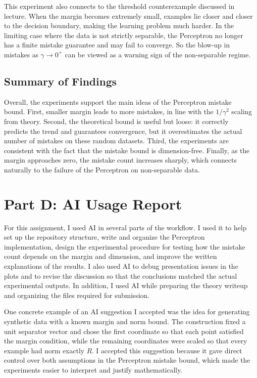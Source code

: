 \documentclass{article}
\begin{document}
This experiment also connects to the threshold counterexample discussed in lecture. When the margin becomes extremely small, examples lie closer and closer to the decision boundary, making the learning problem much harder. In the limiting case where the data is not strictly separable, the Perceptron no longer has a finite mistake guarantee and may fail to converge. So the blow-up in mistakes as \(\gamma \to 0^+\) can be viewed as a warning sign of the non-separable regime.

\subsection{Summary of Findings}

Overall, the experiments support the main ideas of the Perceptron mistake bound. First, smaller margin leads to more mistakes, in line with the \(1/\gamma^2\) scaling from theory. Second, the theoretical bound is useful but loose: it correctly predicts the trend and guarantees convergence, but it overestimates the actual number of mistakes on these random datasets. Third, the experiments are consistent with the fact that the mistake bound is dimension-free. Finally, as the margin approaches zero, the mistake count increases sharply, which connects naturally to the failure of the Perceptron on non-separable data.
\section{Part D: AI Usage Report}
For this assignment, I used AI in several parts of the workflow. I used it to help set up the repository structure, write and organize the Perceptron implementation, design the experimental procedure for testing how the mistake count depends on the margin and dimension, and improve the written explanations of the results. I also used AI to debug presentation issues in the plots and to revise the discussion so that the conclusions matched the actual experimental outputs. In addition, I used AI while preparing the theory writeup and organizing the files required for submission.

One concrete example of an AI suggestion I accepted was the idea for generating synthetic data with a known margin and norm bound. The construction fixed a unit separator vector and chose the first coordinate so that each point satisfied the margin condition, while the remaining coordinates were scaled so that every example had norm exactly \(R\). I accepted this suggestion because it gave direct control over both assumptions in the Perceptron mistake bound, which made the experiments easier to interpret and justify mathematically.
\end{document}
